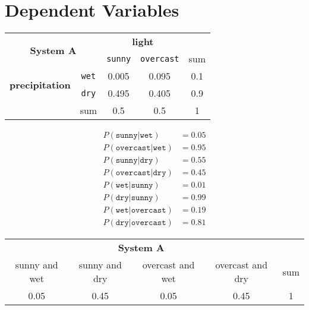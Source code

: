\section{Dependent Variables}

\begin{center}
 \begin{tabular}{c c || c | c || c}
 \multicolumn{2}{c}{\multirow{2}{*}{\textbf{System A}}} & \multicolumn{2}{c}{\textbf{light}} & {}\\
\multicolumn{2}{c}{} & \texttt{sunny} & \texttt{overcast} & sum \\ [0.5ex]
 \hline\hline
\multirow{2}{*}{\textbf{precipitation}} & \texttt{wet} & 0.005 & 0.095 & 0.1 \\
 \cline{2-5}
 & \texttt{dry} & 0.495 & 0.405 & 0.9 \\
 \hline\hline
  {} & sum & 0.5 & 0.5 & 1 \\ [1ex]
\end{tabular}
\end{center}


\begin{align*}
P(\texttt{sunny} | \texttt{wet}) &= 0.05 \\
P(\texttt{overcast} | \texttt{wet}) &= 0.95 \\
P(\texttt{sunny} | \texttt{dry}) &= 0.55 \\
P(\texttt{overcast} | \texttt{dry}) &= 0.45 \\
P(\texttt{wet} | \texttt{sunny}) &= 0.01 \\
P(\texttt{dry} | \texttt{sunny}) &= 0.99 \\
P(\texttt{wet} | \texttt{overcast}) &= 0.19 \\
P(\texttt{dry} | \texttt{overcast}) &= 0.81
\end{align*}


\begin{center}

  \begin{tabular}{c | c | c | c || c}
   \multicolumn{4}{c}{\textbf{System A}} & {}\\
   sunny and wet & sunny and dry & overcast and wet & overcast and dry & sum \\ [0.5ex]
  \hline\hline
   0.05 & 0.45 & 0.05 & 0.45 & 1 \\ [1ex]
 \end{tabular}

\end{center}
